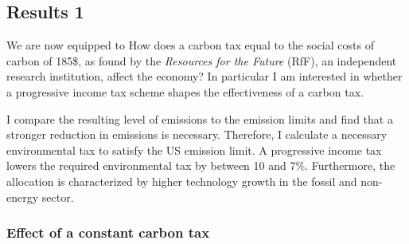 \subsection{Results 1}\label{subsec:exp}

We are now equipped to 
How does a carbon tax  equal to the social costs of carbon of 185\$, as found by the \textit{Resources for the Future} (RfF), an independent research institution, affect the economy? In particular I am interested in whether a progressive income tax scheme shapes the effectiveness of a carbon tax. 

 I compare the resulting level of emissions to the emission limits and find that a stronger reduction in emissions is necessary. Therefore, I calculate a necessary environmental tax to satisfy the US emission limit. A progressive income tax lowers the required environmental tax by between 10 and 7\%. Furthermore, the allocation is characterized by higher technology growth in the fossil and non-energy sector. 


\subsubsection{Effect of a constant carbon tax}

